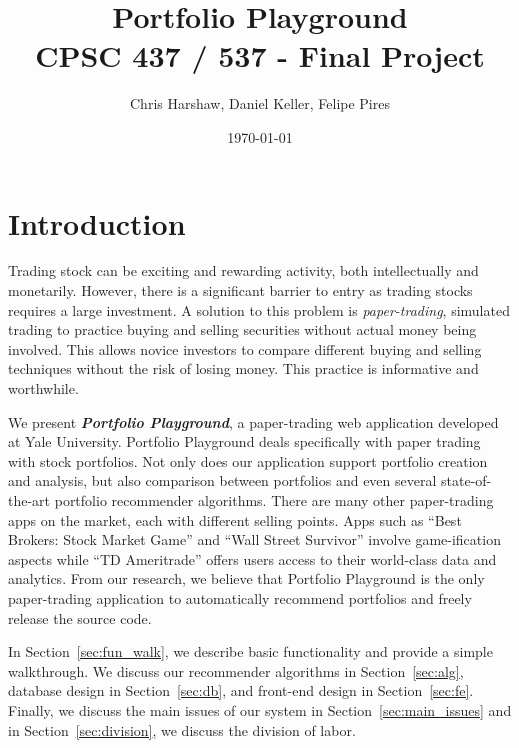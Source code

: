 \documentclass{article}
\begin{document}
\title{Portfolio Playground  \\ CPSC 437 / 537 - Final Project}
\author{Chris Harshaw, Daniel Keller, Felipe Pires}
\date{\today}
\maketitle

\pagestyle{fancy}
\fancyhf{}
\rfoot{\thepage}

\section{Introduction}
Trading stock can be exciting and rewarding activity, both intellectually and monetarily. However, there is a significant barrier to entry as trading stocks requires a large investment. A solution to this problem is \emph{paper-trading}, simulated trading to practice buying and selling securities without actual money being involved. This allows novice investors to compare different buying and selling techniques without the risk of losing money. This practice is informative and worthwhile.

We present \textbf{\emph{Portfolio Playground}}, a paper-trading web application developed at Yale University. Portfolio Playground deals specifically with paper trading with stock portfolios. Not only does our application support portfolio creation and analysis, but also comparison between portfolios and even several state-of-the-art portfolio recommender algorithms. There are many other paper-trading apps on the market, each with different selling points. Apps such as ``Best Brokers: Stock Market Game'' and ``Wall Street Survivor'' involve game-ification aspects while ``TD Ameritrade'' offers users access to their world-class data and analytics. From our research, we believe that Portfolio Playground is the only paper-trading application to automatically recommend portfolios and freely release the source code.

In Section~\ref{sec:fun_walk}, we describe basic functionality and provide a simple walkthrough. We discuss our recommender algorithms in Section~\ref{sec:alg}, database design in Section~\ref{sec:db}, and front-end design in Section~\ref{sec:fe}. Finally, we discuss the main issues of our system in Section~\ref{sec:main_issues} and in Section~\ref{sec:division}, we discuss the division of labor.
\end{document}

